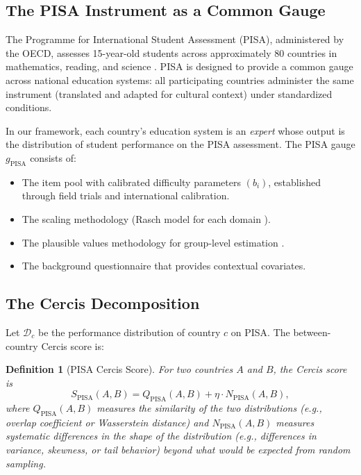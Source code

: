 \documentclass[12pt,a4paper]{article}
\newtheorem{definition}[theorem]{Definition}
\theoremstyle{remark}
\newcommand{\D}{\mathcal{D}}
\begin{document}
\subsection{The PISA Instrument as a Common Gauge}

The Programme for International Student Assessment (PISA), administered by the OECD, assesses 15-year-old students across approximately 80 countries in mathematics, reading, and science \cite{oecd2019}. PISA is designed to provide a common gauge across national education systems: all participating countries administer the same instrument (translated and adapted for cultural context) under standardized conditions.

In our framework, each country's education system is an \emph{expert} whose output is the distribution of student performance on the PISA assessment. The PISA gauge $g_{\text{PISA}}$ consists of:
\begin{itemize}
    \item The item pool with calibrated difficulty parameters $(b_i)$, established through field trials and international calibration.
    \item The scaling methodology (Rasch model for each domain \cite{rasch1960}).
    \item The plausible values methodology for group-level estimation \cite{mislevy1992}.
    \item The background questionnaire that provides contextual covariates.
\end{itemize}

\subsection{The Cercis Decomposition}

Let $\D_c$ be the performance distribution of country $c$ on PISA. The between-country Cercis score is:

\begin{definition}[PISA Cercis Score]
For two countries $A$ and $B$, the Cercis score is
\begin{equation}
S_{\text{PISA}}(A, B) = Q_{\text{PISA}}(A, B) + \eta \cdot N_{\text{PISA}}(A, B),
\label{eq:pisa_cercis}
\end{equation}
where $Q_{\text{PISA}}(A, B)$ measures the similarity of the two distributions (e.g., overlap coefficient or Wasserstein distance) and $N_{\text{PISA}}(A, B)$ measures systematic differences in the shape of the distribution (e.g., differences in variance, skewness, or tail behavior) beyond what would be expected from random sampling.
\end{definition}
\end{document}
